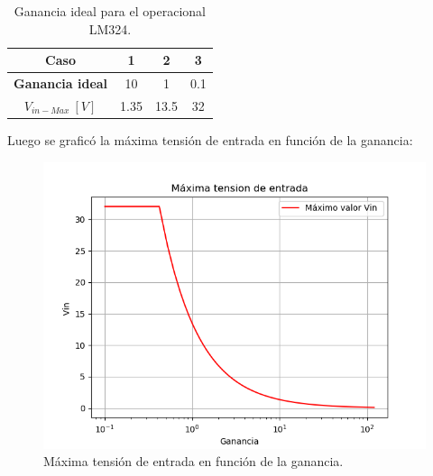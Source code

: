 \begin{table}[H]
\begin{center}
\label{tab:maxin}
\begin{tabular}{|c|c|c|c|}
\hline
\textbf{Caso}        & \textbf{1} & \textbf{2} & \textbf{3} \\ \hline
\textbf{Ganancia ideal}     & 10         & 1          & 0.1        \\ \hline
\textbf{$V_{in-Max} \ \left[ V \right]$} & 1.35       & 13.5       & 32         \\ \hline
\end{tabular}
\end{center}
\caption{Ganancia ideal para el operacional LM324.}
\label{tab:gananciaideal}
\end{table}


Luego se graficó la máxima tensión de entrada en función de la ganancia:
\begin{figure}[H]	
	\centering
	\includegraphics[width=\textwidth]{Ejercicio1/Imagenes/maxvin.png}
	\caption{Máxima tensión de entrada en función de la ganancia.}
	\label{fig:MaxVin}
\end{figure} 

